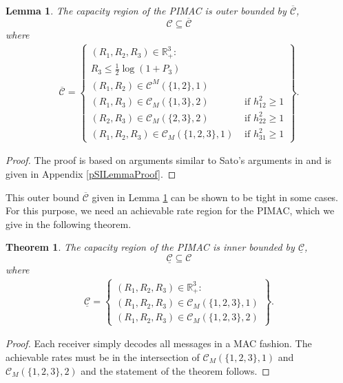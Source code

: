 \documentclass[10pt,conference]{IEEEtran}
\newtheorem{theorem}{Theorem}
\newtheorem{lemma}{Lemma}
\begin{document}
\begin{lemma}
\label{pSILemma}
The capacity region of the PIMAC is outer bounded by $\overline{\mathcal{C}}$, $$\mathcal{C}\subseteq\overline{\mathcal{C}}$$ where
\begin{align*}
\overline{\mathcal{C}}=\left\{
\begin{array}{lr}
(R_1,R_2,R_3)\in\mathbb{R}_+^3:&\\
R_3\leq\frac{1}{2}\log(1+P_3)&\\
(R_1,R_2)\in\mathcal{C}^M(\{1,2\},1)&\\
(R_1,R_3)\in\mathcal{C}_M(\{1,3\},2)& \text{ if } h_{12}^2\geq1\\
(R_2,R_3)\in\mathcal{C}_M(\{2,3\},2)& \text{ if } h_{22}^2\geq1\\
(R_1,R_2,R_3)\in\mathcal{C}_M(\{1,2,3\},1)& \text{ if } h_{31}^2\geq1
\end{array}\right\}.
\end{align*} 
\end{lemma}
\begin{proof}
The proof is based on arguments similar to Sato's arguments in \cite{Sato} and is given in Appendix \ref{pSILemmaProof}.
\end{proof}

This outer bound $\overline{\mathcal{C}}$ given in Lemma \ref{pSILemma} can be shown to be tight in some cases. For this purpose, we need an achievable rate region for the PIMAC, which we give in the following theorem.

\begin{theorem}
\label{InnerBound}
The capacity region of the PIMAC is inner bounded by $\underline{\mathcal{C}}$, $$\underline{\mathcal{C}}\subseteq\mathcal{C}$$
where
\begin{align}
\underline{\mathcal{C}}=\left\{
\begin{array}{l}
(R_1,R_2,R_3)\in\mathbb{R}_+^3:\\
(R_1,R_2,R_3)\in\mathcal{C}_M(\{1,2,3\},1)\\
(R_1,R_2,R_3)\in\mathcal{C}_M(\{1,2,3\},2)
\end{array}\right\}.
\end{align} 
\end{theorem}
\begin{proof}
Each receiver simply decodes all messages in a MAC fashion. The achievable rates must be in the intersection of $\mathcal{C}_M(\{1,2,3\},1)$ and $\mathcal{C}_M(\{1,2,3\},2)$ and the statement of the theorem follows.
\end{proof}
\end{document}
